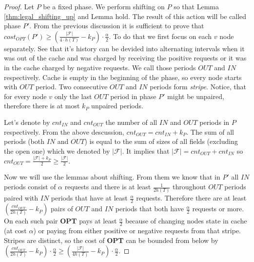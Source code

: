 \begin{proof}
Let $P$ be a fixed phase. We perform shifting on $P$ so that Lemma 
\ref{thm:legal_shifting_up} and Lemma \label{thm:legal_shifting_down} hold. The 
result of this action will be called phase $P'$. From the previous discussion 
it is sufficient to prove that $cost_{OPT}(P') \geq (\frac{|\mathcal{F}|}{4 
\cdot h(T)}-k_P) \cdot \frac{\alpha}{2}$. To do that we first focus on each $v$ 
node separately. See that it's history can be devided into alternating 
intervals when it was out of the cache and was charged by receiving the positive 
requests or it was in the cache charged by negative requests. We call those 
periods $OUT$ and $IN$ respectively. Cache is empty in the beginning of the 
phase, so every node starts with $OUT$ period. Two consecutive $OUT$ and $IN$ 
periods form \textit{stripe}. Notice, that for every node $v$ only the last 
$OUT$ period in phase $P'$ might be unpaired, therefore there is at most $k_P$ 
unpaired periods.

Let's denote by $cnt_{IN}$ and $cnt_{OUT}$ the number of all $IN$ and $OUT$ 
periods in $P$ respectively. From the above descussion, $cnt_{OUT} = cnt_{IN} + 
k_P$. The sum of all periods (both $IN$ and $OUT$) is equal to the sum of sizes 
of all fields (excluding the open one) which we denoted by $|\mathcal{F}|$. It 
implies that $|\mathcal{F}| = cnt_{OUT} + cnt_{IN}$ so $cnt_{OUT} = 
\frac{|\mathcal{F}| + k_P}{2} \geq \frac{|\mathcal{F}|}{2}.$

Now we will use the lemmas about shifting. From them we know that in $P'$ all 
$IN$ periods consist of $\alpha$ requests and there is at least 
$\frac{1}{2h(T)}$ throughout $OUT$ periods paired with $IN$ periods that have 
at least $\frac{\alpha}{2}$ requests. Therefore there are at least 
$(\frac{cnt_{OUT}}{2h(T)} - k_P)$ pairs of $OUT$ and $IN$ periods that both 
have $\frac{\alpha}{2}$ requests or more. On each such pair \textbf{OPT} pays 
at least $\frac{\alpha}{2}$ because of changing nodes state in cache (at cost 
$\alpha$) or paying from either positive or negative requests from that stripe. 
Stripes are distinct, so the cost of \textbf{OPT} can be bounded from below by 
$(\frac{cnt_{OUT}}{2h(T)} - k_P) \cdot \frac{\alpha}{2} \geq 
(\frac{|\mathcal{F}|}{4h(T)} - k_P) \cdot  \frac{\alpha}{2}$.
\end{proof}


